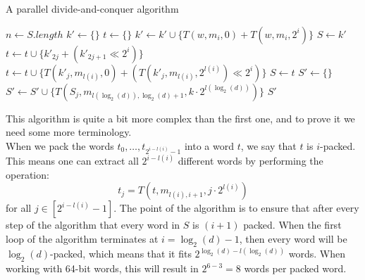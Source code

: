 \begin{algorithm}[H]
\caption{A parallel divide-and-conquer algorithm}\label{alg:parallel-d-and-c}
    \begin{algorithmic}
         
            \State $n \gets S.length$
                \State $k' \gets \{\}$
                \State $t \gets \{\}$
                    \State $k' \gets k' \cup \{T(w, m_i, 0) + T(w, m_i, 2^i)\}$
                \EndFor
                    \State $S \gets k'$
                \Else
                    \State $t \gets t \cup \{k'_{2j} + (k'_{2j+1} \ll 2^i)\}$ %
                    \EndFor
                \Else
                        \State $t \gets t \cup \{T(k'_{j}, m_{l(i)}, 0) + (T(k'_{j}, m_{l(i)}, 2^{l(i)}) \ll 2^{i})\}$
                    \EndFor
                \EndIf
                \State $S \gets t$
                \EndIf
            \EndFor
            \State $S' \gets \{\}$
             
                \State $S' \gets S' \cup \{T(S_j, m_{l(\log_2(d)), \log_2(d) + 1}, k\cdot 2^{l(\log_2(d))})\}$
                \EndFor
            \EndFor
            \State \Return $S'$
        \EndFunction
    \end{algorithmic}
\end{algorithm}
This algorithm is quite a bit more complex than the first one, and to prove it we need some more terminology.\\
When we pack the words $t_0, \dots, t_{2^{i-l(i)}-1}$ into a word $t$, we say that $t$ is $i$-packed. This means one can extract all $2^{i-l(i)}$ different words by performing the operation:
\begin{equation}
    \label{eq:extract-from-embed}
t_j=T(t, m_{l(i), i+1}, j\cdot 2^{l(i)})
\end{equation}
for all $j\in [2^{i-l(i)}-1]$.
The point of the algorithm is to ensure that after every step of the algorithm that every word in $S$ is $(i+1)$ packed. When the first loop of the algorithm terminates at $i=\log_2(d)-1$, then every word will be $\log_2(d)$-packed, which means that it fits $2^{\log_2(d)-l(\log_2(d))}$ words. When working with 64-bit words, this will result in $2^{6-3}=8$ words per packed word.
